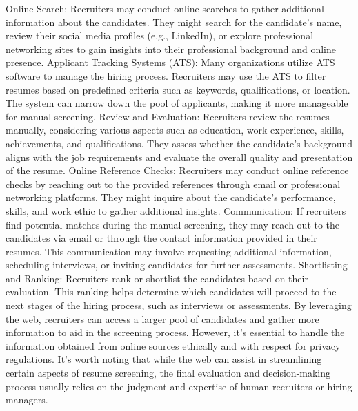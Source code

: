 \documentclass[12 pt, oneside]{book}
\begin{document}
Online Search: Recruiters may conduct online searches to gather additional information about the candidates. They might search for the candidate's name, review their social media profiles (e.g., LinkedIn), or explore professional networking sites to gain insights into their professional background and online presence.
\newline
Applicant Tracking Systems (ATS): Many organizations utilize ATS software to manage the hiring process. Recruiters may use the ATS to filter resumes based on predefined criteria such as keywords, qualifications, or location. The system can narrow down the pool of applicants, making it more manageable for manual screening.
\newline
Review and Evaluation: Recruiters review the resumes manually, considering various aspects such as education, work experience, skills, achievements, and qualifications. They assess whether the candidate's background aligns with the job requirements and evaluate the overall quality and presentation of the resume.
\newline
Online Reference Checks: Recruiters may conduct online reference checks by reaching out to the provided references through email or professional networking platforms. They might inquire about the candidate's performance, skills, and work ethic to gather additional insights.
\newline
Communication: If recruiters find potential matches during the manual screening, they may reach out to the candidates via email or through the contact information provided in their resumes. This communication may involve requesting additional information, scheduling interviews, or inviting candidates for further assessments.
\newline
Shortlisting and Ranking: Recruiters rank or shortlist the candidates based on their evaluation. This ranking helps determine which candidates will proceed to the next stages of the hiring process, such as interviews or assessments.
\newline
By leveraging the web, recruiters can access a larger pool of candidates and gather more information to aid in the screening process. However, it's essential to handle the information obtained from online sources ethically and with respect for privacy regulations.
\newline
It's worth noting that while the web can assist in streamlining certain aspects of resume screening, the final evaluation and decision-making process usually relies on the judgment and expertise of human recruiters or hiring managers.
\end{document}
